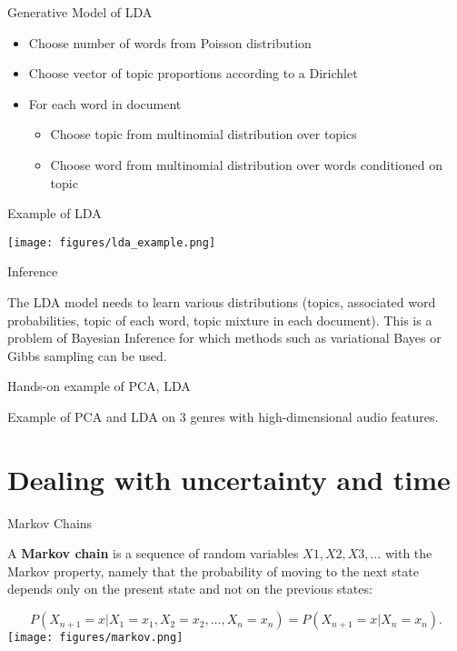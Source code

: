 \documentclass[12pt]{beamer}
\begin{document}
\begin{frame}{Generative Model of LDA}
\begin{itemize} 
\item Choose number of words from Poisson distribution 
\item Choose vector of topic proportions according to a Dirichlet 
\item For each word in document 
\begin{itemize} 
\item Choose topic from multinomial distribution over topics 
\item Choose word from multinomial distribution over words conditioned on topic 
\end{itemize} 
\end{itemize} 

\end{frame} 


\begin{frame}{Example of LDA} 
\begin{center}
\texttt{[image: figures/lda\_example.png]}
\end{center}
\end{frame} 

\begin{frame}{Inference} 

The LDA model needs to learn various distributions (topics, associated
word probabilities, topic of each word, topic mixture in each
document). This is a problem of Bayesian Inference for which methods
such as variational Bayes or Gibbs sampling can be used.

\end{frame}


\begin{frame}{Hands-on example of PCA, LDA}

  Example of PCA and LDA on 3 genres with high-dimensional audio features.
    
  \end{frame} 



\section{Dealing with uncertainty and time}


\begin{frame}{Markov Chains}

  A {\bf Markov chain} is a sequence of random variables $X1, X2, X3,
  \dots$ with the Markov property, namely that the probability of
  moving to the next state depends only on the present state and not
  on the previous states:

  \[
P(X_{n+1} = x | X_1 = x_1, X_2 = x_2, \dots, X_n = x_n) = P(X_{n+1} =
x | X_{n} = x_n).
\]
  \hspace{4cm} 
 \texttt{[image: figures/markov.png]}  
\end{frame}
\end{document}
